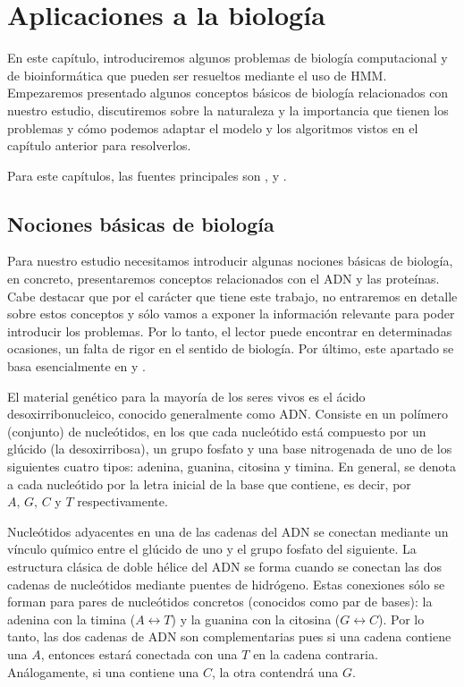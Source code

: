 \chapter{Aplicaciones a la biología}

En este capítulo, introduciremos algunos problemas de biología computacional y de bioinformática que pueden ser resueltos mediante el uso de HMM. Empezaremos presentado algunos conceptos básicos de biología relacionados con nuestro estudio, discutiremos sobre la naturaleza y la importancia que tienen los problemas y cómo podemos adaptar el modelo y los algoritmos vistos en el capítulo anterior para resolverlos.

Para este capítulos, las fuentes principales son \cite{Durbin}, \cite{Yoon} y \cite[Capítulo 8]{Vidyasagar}.

\section{Nociones básicas de biología}
Para nuestro estudio necesitamos introducir algunas nociones básicas de biología, en concreto, presentaremos conceptos relacionados con el ADN y las proteínas. Cabe destacar que por el carácter que tiene este trabajo, no entraremos en detalle sobre estos conceptos y sólo vamos a exponer la información relevante para poder introducir los problemas. Por lo tanto, el lector puede encontrar en determinadas ocasiones, un falta de rigor en el sentido de biología. Por último, este apartado se basa esencialmente en \cite[Capítulo 8]{Vidyasagar} y \cite[Apéndice A]{Warren}.

El material genético para la mayoría de los seres vivos es el ácido desoxirribonucleico, conocido generalmente como ADN. Consiste en un polímero (conjunto) de nucleótidos, en los que cada nucleótido está compuesto por un glúcido (la desoxirribosa), un grupo fosfato y una base nitrogenada de uno de los siguientes cuatro tipos: adenina, guanina, citosina y timina. En general, se denota a cada nucleótido por la letra inicial de la base que contiene, es decir, por $A,\, G,\, C$ y $T$ respectivamente. 

Nucleótidos adyacentes en una de las cadenas del ADN se conectan mediante un vínculo químico entre el glúcido de uno y el grupo fosfato del siguiente. La estructura clásica de doble hélice del ADN se forma cuando se conectan las dos cadenas de nucleótidos mediante puentes de hidrógeno. Estas conexiones sólo se forman para pares de nucleótidos concretos (conocidos como par de bases): la adenina con la timina ($A\leftrightarrow T$) y la guanina con la citosina ($G\leftrightarrow C$). Por lo tanto, las dos cadenas de ADN son complementarias pues si una cadena contiene una $A$, entonces estará conectada con una $T$ en la cadena contraria. Análogamente, si una contiene una $C$, la otra contendrá una $G$. 

